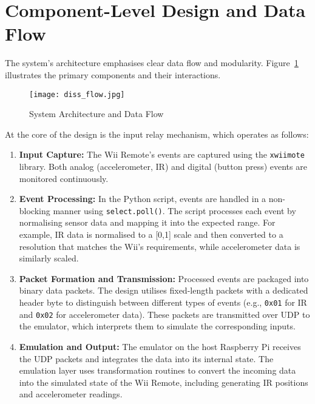 \section{Component-Level Design and Data Flow}

The system’s architecture emphasises clear data flow and modularity. Figure~\ref{fig:architecture} illustrates the primary components and their interactions.

\begin{figure}[h]
	\centering
	\texttt{[image: diss\_flow.jpg]}
	\caption{System Architecture and Data Flow}
	\label{fig:architecture}
\end{figure}

At the core of the design is the input relay mechanism, which operates as follows:

\begin{enumerate}
    \item \textbf{Input Capture:}
          The Wii Remote’s events are captured using the \texttt{xwiimote} library. Both analog (accelerometer, IR) and digital (button press) events are monitored continuously.

    \item \textbf{Event Processing:}
          In the Python script, events are handled in a non-blocking manner using \texttt{select.poll()}. The script processes each event by normalising sensor data and mapping it into the expected range. For example, IR data is normalised to a [0,1] scale and then converted to a resolution that matches the Wii’s requirements, while accelerometer data is similarly scaled.

    \item \textbf{Packet Formation and Transmission:}
          Processed events are packaged into binary data packets. The design utilises fixed-length packets with a dedicated header byte to distinguish between different types of events (e.g., \texttt{0x01} for IR and \texttt{0x02} for accelerometer data). These packets are transmitted over UDP to the emulator, which interprets them to simulate the corresponding inputs.

    \item \textbf{Emulation and Output:}
          The emulator on the host Raspberry Pi receives the UDP packets and integrates the data into its internal state. The emulation layer uses transformation routines to convert the incoming data into the simulated state of the Wii Remote, including generating IR positions and accelerometer readings.
\end{enumerate}


